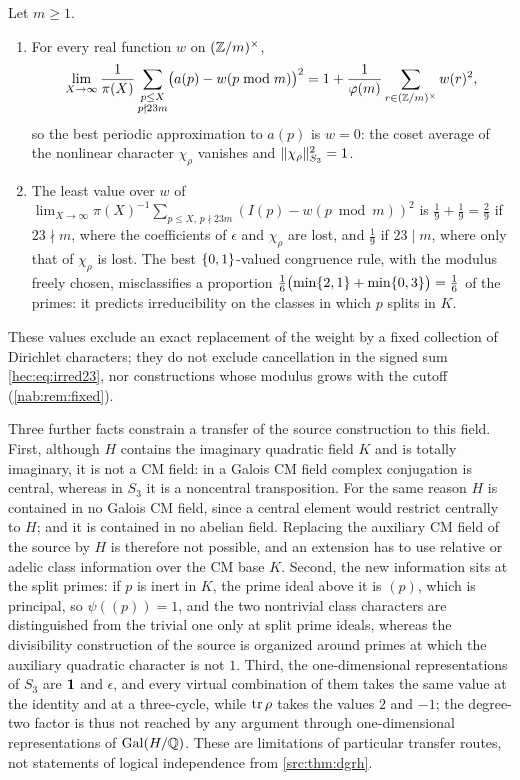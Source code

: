 \begin{corollary}\label{hec:prop:meansq}
Let $m\ge1$.
\begin{enumerate}[label=\textup{(\roman*)}]
\item For every real function $w$ on $(\mathbb{Z}/m)^\times$,
\[
 \lim_{X\to\infty}\frac1{\pi(X)}\sum_{\substack{p\le X\\p\nmid23m}}\bigl(a(p)-w(p\bmod m)\bigr)^2
 =1+\frac1{\varphi(m)}\sum_{r\in(\mathbb{Z}/m)^\times}w(r)^2 ,
\]
so the best periodic approximation to $a(p)$ is $w=0$: the coset average of the nonlinear character
$\chi_\rho$ vanishes and $\lVert\chi_\rho\rVert^2_{S_3}=1$.
\item The least value over $w$ of
$\lim_{X\to\infty}\pi(X)^{-1}\sum_{p\le X,\,p\nmid23m}(I(p)-w(p\bmod m))^2$ is
$\tfrac19+\tfrac19=\tfrac29$ if $23\nmid m$, where the coefficients of $\epsilon$ and $\chi_\rho$ are lost,
and $\tfrac19$ if $23\mid m$, where only that of $\chi_\rho$ is lost. The best $\{0,1\}$-valued
congruence rule, with the modulus freely chosen, misclassifies a proportion
$\tfrac16\bigl(\min\{2,1\}+\min\{0,3\}\bigr)=\tfrac16$ of the primes: it predicts irreducibility on the
classes in which $p$ splits in $K$.
\end{enumerate}
\end{corollary}

These values exclude an exact replacement of the weight by a fixed collection of Dirichlet characters;
they do not exclude cancellation in the signed sum \eqref{hec:eq:irred23}, nor constructions whose modulus grows
with the cutoff (\cref{nab:rem:fixed}).

\begin{remark}\label{hec:rem:structural}
Three further facts constrain a transfer of the source construction to this field.
First, although $H$ contains the imaginary quadratic field $K$ and is totally imaginary, it is not a CM
field: in a Galois CM field complex conjugation is central, whereas in $S_3$ it is a noncentral
transposition. For the same reason $H$ is contained in no Galois CM field, since a central element would
restrict centrally to $H$; and it is contained in no abelian field. Replacing the auxiliary CM field of the
source by $H$ is therefore not possible, and an extension has to use relative or adelic class information
over the CM base $K$. Second, the new information sits at the split primes: if $p$ is inert in $K$, the
prime ideal above it is $(p)$, which is principal, so $\psi((p))=1$, and the two nontrivial class characters
are distinguished from the trivial one only at split prime ideals, whereas the divisibility construction
of the source is organized around primes at which the auxiliary quadratic character is not $1$. Third, the
one-dimensional representations of $S_3$ are $\mathbf{1}$ and $\epsilon$, and every virtual combination of them
takes the same value at the identity and at a three-cycle, while $\operatorname{tr}\rho$ takes the values $2$ and $-1$;
the degree-two factor is thus not reached by any argument through one-dimensional representations of
$\operatorname{Gal}(H/\mathbb{Q})$. These are limitations of particular transfer routes, not statements of logical independence
from \cref{src:thm:dgrh}.
\end{remark}

